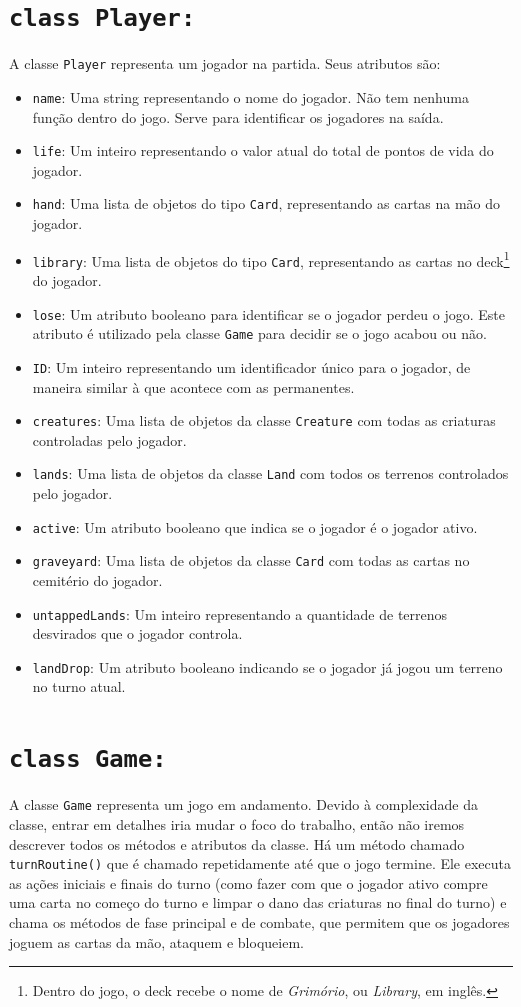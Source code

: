 \section{\texttt{class Player:}}
A classe \texttt{Player} representa um jogador na partida. Seus atributos são:
\begin{itemize}
  \item\texttt{name}: Uma string representando o nome do jogador. Não tem nenhuma função
  dentro do jogo. Serve para identificar os jogadores na saída.
  \item\texttt{life}: Um inteiro representando o valor atual do total de pontos de vida
  do jogador.
  \item\texttt{hand}: Uma lista de objetos do tipo \texttt{Card}, representando as cartas
  na mão do jogador.
  \item\texttt{library}: Uma lista de objetos do tipo \texttt{Card}, representando as cartas
  no deck\footnote{Dentro do jogo, o deck recebe o nome de \textit{Grimório}, ou \textit{Library},
  em inglês.} do jogador.
  \item\texttt{lose}: Um atributo booleano para identificar se o jogador perdeu o jogo. Este
  atributo é utilizado pela classe \texttt{Game} para decidir se o jogo acabou ou não.
  \item\texttt{ID}: Um inteiro representando um identificador único para o jogador, de maneira
  similar à que acontece com as permanentes.
  \item\texttt{creatures}: Uma lista de objetos da classe \texttt{Creature} com todas as
  criaturas controladas pelo jogador.
  \item\texttt{lands}: Uma lista de objetos da classe \texttt{Land} com todos os terrenos
  controlados pelo jogador.
  \item\texttt{active}: Um atributo booleano que indica se o jogador é o jogador ativo.
  \item\texttt{graveyard}: Uma lista de objetos da classe \texttt{Card} com todas as cartas
  no cemitério do jogador.
  \item\texttt{untappedLands}: Um inteiro representando a quantidade de terrenos desvirados que
  o jogador controla.
  \item\texttt{landDrop}: Um atributo booleano indicando se o jogador já jogou um terreno no
  turno atual.
\end{itemize}

\section{\texttt{class Game:}}
A classe \texttt{Game} representa um jogo em andamento. Devido à complexidade da classe, entrar
em detalhes iria mudar o foco do trabalho, então não iremos descrever todos os métodos e atributos
da classe. Há um método chamado \texttt{turnRoutine()} que é chamado repetidamente até que o jogo
termine. Ele executa as ações iniciais e finais do turno (como fazer com que o jogador ativo compre
uma carta no começo do turno e limpar o dano das criaturas no final do turno) e chama os métodos de
fase principal e de combate, que permitem que os jogadores joguem as cartas da mão, ataquem e
bloqueiem.

